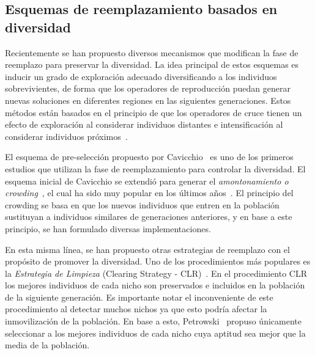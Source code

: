 \subsection{Esquemas de reemplazamiento basados en diversidad}

Recientemente se han propuesto diversos mecanismos que modifican la fase de reemplazo para preservar la diversidad.
%
La idea principal de estos esquemas es inducir un grado de exploración adecuado diversificando a los individuos sobrevivientes,
de forma que los operadores de reproducción puedan generar nuevas soluciones en diferentes regiones en las siguientes generaciones.
%
Estos métodos están basados en el principio de que los operadores de cruce tienen un efecto de exploración al 
considerar individuos distantes e intensificación al considerar individuos próximos~\cite{eiben1998evolutionary}.

El esquema de pre-selección propuesto por Cavicchio~\cite{grefenstette1986optimization} es uno de los primeros estudios que utilizan 
la fase de reemplazamiento para controlar la diversidad.
%
El esquema inicial de Cavicchio se extendió para generar el \textit{amontonamiento o crowding}~\cite{de1975analysis}, el cual ha sido muy popular 
en los últimos años~\cite{mahfoud1992crowding, mengshoel2014adaptive}.
%
El principio del crowding se basa en que los nuevos individuos que entren en la población sustituyan a individuos similares de generaciones anteriores, y en base
a este principio, se han formulado diversas implementaciones.

En esta misma línea, se han propuesto otras estrategias de reemplazo con el propósito de promover la diversidad.
%
Uno de los procedimientos más populares es la \textit{Estrategia de Limpieza} (Clearing Strategy - CLR)~\cite{lozano2008replacement}.
%
En el procedimiento CLR los mejores individuos de cada nicho son preservados e incluidos en la población de la siguiente generación.
%
Es importante notar el inconveniente de este procedimiento al detectar muchos nichos ya que esto podría afectar la inmovilización de la población.
%
En base a esto, Petrowski~\cite{petrowski1996clearing} propuso únicamente seleccionar a los mejores individuos de cada nicho cuya aptitud sea mejor que la media de la población.
%


